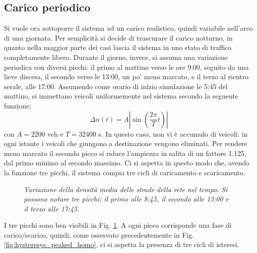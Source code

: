 \documentclass[../main.tex]{subfiles}
\begin{document}
\subsection{Carico periodico}
Si vuole ora sottoporre il sistema ad un carico realistico, quindi variabile nell'arco di una giornata.
Per semplicit\`a si decide di trascurare il carico notturno, in quanto nella maggior parte dei casi lascia il sistema in uno stato di traffico completamente libero.
Durante il giorno, invece, si assuma una variazione periodica con diversi picchi: il primo al mattino verso le ore 9:00, seguito da una lieve discesa, il secondo verso le 13:00, un po' meno marcato, e il terzo al rientro serale, alle 17:00.
Assumendo come orario di inizio simulazione le 5:45 del mattino, si immettano veicoli uniformemente nel sistema secondo la seguente funzione:
\begin{equation}
    \Delta n(t) = A \left\lvert \sin\left(\frac{2\pi}{T}t\right) \right\rvert 
\end{equation}
con $A = 2200$ veh e $T = 32400$ s.
In questo caso, non vi \`e accumulo di veicoli: in ogni istante i veicoli che giungono a destinazione vengono eliminati.
Per rendere meno marcato il secondo picco si riduce l'ampiezza in salita di un fattore 1.125, dal primo minimo al secondo massimo.
Ci si aspetta in questo modo che, avendo la funzione tre picchi, il sistema compia tre cicli di caricamento e scaricamento.
\begin{figure}[H]
    \centering
    \caption[Variazione periodica della densit\`a in un reticolo omogeneo]{\emph{Variazione della densit\`a media delle strade della rete nel tempo. Si possono notare tre picchi: il primo alle 8:45, il secondo alle 13:00 e il terzo alle 17:45.}}
    \label{fig:density_time_periodic_homo}
\end{figure}
I tre picchi sono ben visibili in Fig. \ref{fig:density_time_periodic_homo}.
A ogni picco corrisponde una fase di carico/scarico, quindi, come osservato precedentemente in Fig. \ref{fig:hysteresys_peaked_homo}, ci si aspetta la presenza di tre cicli di isteresi.
\end{document}
